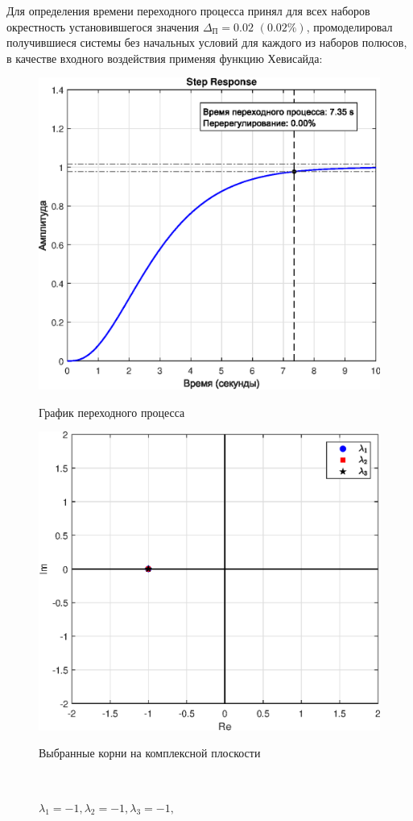 \documentclass[a4paper]{article}
\begin{document}
Для определения времени переходного процесса принял для всех наборов окрестность установившегося значения $\Delta_\text{П} = 0.02 \,\, (0.02\%)$, промоделировал получившиеся системы без начальных условий для каждого из наборов полюсов, в качестве входного воздействия применяя функцию Хевисайда:

\begin{figure}[H]
    \begin{minipage}{0.5\textwidth}
        \centering \includegraphics[width=\textwidth]{ex2/-1_-1_-1.eps}
        \caption{$\lambda_1=-1, \lambda_2=-1, \lambda_3=-1,$}
        \centerline{График переходного процесса}
    \end{minipage}\hfill
    \begin{minipage}{0.5\textwidth}
        \centering \includegraphics[width=\textwidth]{ex2/complex_plan_-1_-1_-1.eps}
        \caption{$\lambda_1=-1, \lambda_2=-1, \lambda_3=-1,$}
        \centerline{Выбранные корни на комплексной плоскости}
    \end{minipage}\\[1em]
\end{figure}\noindent\
\end{document}
